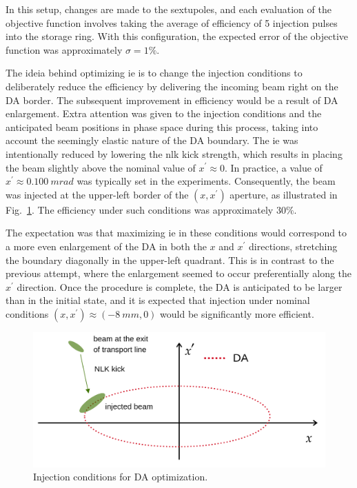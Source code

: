 In this setup, changes are made to the sextupoles, and each evaluation of the objective function involves taking the average of efficiency of 5 injection pulses into the storage ring. With this configuration, the expected error of the objective function was approximately $\sigma=1\%$.

The ideia behind optimizing \gls*{ie} is to change the injection conditions to deliberately reduce the efficiency by delivering the incoming beam right on the \gls*{DA} border. The subsequent improvement in efficiency would be a result of \gls*{DA} enlargement. Extra attention was given to the injection conditions and the anticipated beam positions in phase space during this process, taking into account the seemingly elastic nature of the \gls*{DA} boundary. The \gls*{ie} was intentionally reduced by lowering the \gls*{nlk} kick strength, which results in placing the beam slightly above the nominal value of $x^\prime\approx 0$. In practice, a value of $x^\prime\approx 0.100~\unit{mrad}$ was typically set in the experiments. Consequently, the beam was injected at the upper-left border of the $(x,x^\prime)$ aperture, as illustrated in Fig.~\ref{fig:inj_cond}. The efficiency under such conditions was approximately $30\%$.

The expectation was that maximizing \gls*{ie} in these conditions would correspond to a more even enlargement of the \gls*{DA} in both the $x$ and $x^{\prime}$ directions, stretching the boundary diagonally in the upper-left quadrant. This is in contrast to the previous attempt, where the enlargement seemed to occur preferentially along the $x^\prime$ direction. Once the procedure is complete, the \gls*{DA} is anticipated to be larger than in the initial state, and it is expected that injection under nominal conditions $(x, x^\prime)\approx(-8~\unit{mm}, 0)$ would be significantly more efficient.
\begin{figure}[tb]
    \centering
    \includegraphics[width=0.7\columnwidth]{Images/inj_cond.png}
    \caption[Injection conditions for DA optimization.]{Injection conditions for \gls*{DA} optimization.}
    \label{fig:inj_cond}
\end{figure}

